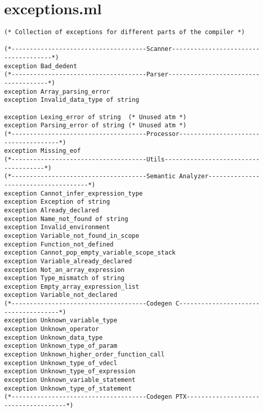\section{exceptions.ml}
\begin{verbatim}
(* Collection of exceptions for different parts of the compiler *)

(*-------------------------------------Scanner-------------------------------------*)
exception Bad_dedent
(*-------------------------------------Parser-------------------------------------*)
exception Array_parsing_error
exception Invalid_data_type of string

exception Lexing_error of string  (* Unused atm *)
exception Parsing_error of string (* Unused atm *)
(*-------------------------------------Processor-------------------------------------*)
exception Missing_eof
(*-------------------------------------Utils-------------------------------------*)
(*-------------------------------------Semantic Analyzer-------------------------------------*)
exception Cannot_infer_expression_type
exception Exception of string
exception Already_declared
exception Name_not_found of string
exception Invalid_environment
exception Variable_not_found_in_scope
exception Function_not_defined
exception Cannot_pop_empty_variable_scope_stack
exception Variable_already_declared
exception Not_an_array_expression
exception Type_mismatch of string
exception Empty_array_expression_list
exception Variable_not_declared
(*-------------------------------------Codegen C-------------------------------------*)
exception Unknown_variable_type
exception Unknown_operator
exception Unknown_data_type
exception Unknown_type_of_param
exception Unknown_higher_order_function_call
exception Unknown_type_of_vdecl
exception Unknown_type_of_expression
exception Unknown_variable_statement
exception Unknown_type_of_statement
(*-------------------------------------Codegen PTX-------------------------------------*)
\end{verbatim}	